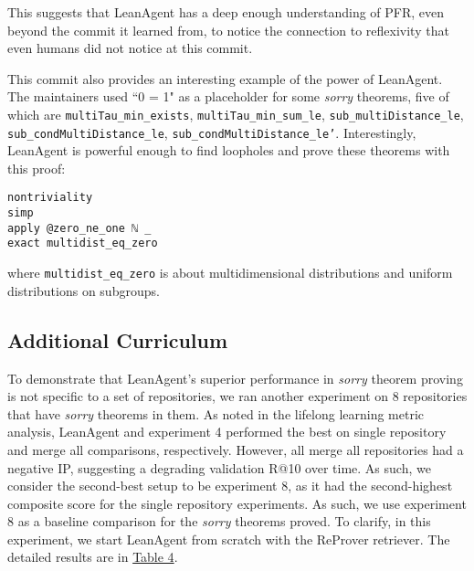 \documentclass{article} %
\begin{document}
This suggests that LeanAgent has a deep enough understanding of PFR, even beyond the commit it learned from, to notice the connection to reflexivity that even humans did not notice at this commit.

This commit also provides an interesting example of the power of LeanAgent. The maintainers used ``0 = 1" as a placeholder for some \textit{sorry} theorems, five of which are \texttt{multiTau\_min\_exists}, \texttt{multiTau\_min\_sum\_le}, \texttt{sub\_multiDistance\_le}, \texttt{sub\_condMultiDistance\_le}, \texttt{sub\_condMultiDistance\_le'}. Interestingly, LeanAgent is powerful enough to find loopholes and prove these theorems with this proof:

\begin{verbatim}
nontriviality
simp
apply @zero_ne_one ℕ _
exact multidist_eq_zero
\end{verbatim}

where \texttt{multidist\_eq\_zero} is about multidimensional distributions and uniform distributions on subgroups.

\subsection{Additional Curriculum}

To demonstrate that LeanAgent's superior performance in \textit{sorry} theorem proving is not specific to a set of repositories, we ran another experiment on 8 repositories that have \textit{sorry} theorems in them. As noted in the lifelong learning metric analysis, LeanAgent and experiment 4 performed the best on single repository and merge all comparisons, respectively. However, all merge all repositories had a negative IP, suggesting a degrading validation R@10 over time. As such, we consider the second-best setup to be experiment 8, as it had the second-highest composite score for the single repository experiments. As such, we use experiment 8 as a baseline comparison for the \textit{sorry} theorems proved. To clarify, in this experiment, we start LeanAgent from scratch with the ReProver retriever. The detailed results are in \hyperref[tab:theorem-proofs-2]{Table 4}.
\end{document}
